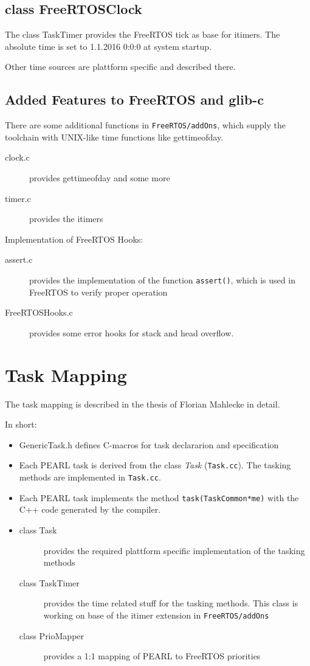 \subsection{class FreeRTOSClock}
The class TaskTimer provides the FreeRTOS tick as
base for itimers.
The absolute time is set to 1.1.2016 0:0:0 at system startup.

Other time sources are plattform specific and described there.

\subsection{Added Features to FreeRTOS and glib-c}
There are some additional functions in \texttt{FreeRTOS/addOns},
 which supply the toolchain
with UNIX-like time functions like gettimeofday.
\begin{description}
\item[clock.c]provides gettimeofday and some more
\item[timer.c] provides the itimers
\end{description}

Implementation of FreeRTOS Hooks:
\begin{description}
\item[assert.c] provides the implementation of the function
  \texttt{assert()}, which is used in FreeRTOS to verify
  proper operation
\item[FreeRTOSHooks.c] provides some error hooks for stack and head overflow.
\end{description}

\section{Task Mapping}

The task mapping is described in the thesis of
 Florian Mahlecke in detail.

In short:
\begin{itemize}
\item GenericTask.h defines C-macros for task declararion and specification
\item Each PEARL task is derived from the class {\em Task} (\verb|Task.cc|).
      The tasking methods are implemented in \verb|Task.cc|.
\item Each PEARL task implements the method \verb|task(TaskCommon*me)| 
    with the C++ code generated by the compiler.
\item {
  \begin{description}
  \item[class Task] provides the required plattform specific implementation
     of the tasking methods
  \item[class TaskTimer] provides the time related stuff for the tasking
     methods. This class is working on base of the itimer extension 
     in \texttt{FreeRTOS/addOns}
  \item[class PrioMapper] provides a 1:1 mapping of PEARL to FreeRTOS
      priorities
  \end{description}
}
\end{itemize}



